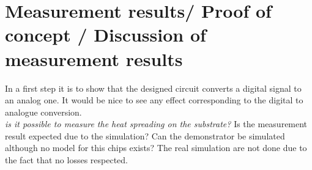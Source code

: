 \section{Measurement results/ Proof of concept / Discussion of measurement results}
In a first step it is to show that the designed circuit converts a digital signal to an analog one. It would be nice to see any effect corresponding to the digital to analogue conversion. \\
\textit{is it possible to measure the heat spreading on the substrate?}
Is the measurement result expected due to the simulation? Can the demonstrator be simulated although no model for this chips exists? The real simulation are not done due to the fact that no losses respected.

